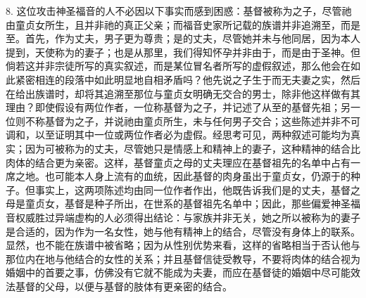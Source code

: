 8. 这位攻击神圣福音的人不必因以下事实而感到困惑：基督被称为之子，尽管祂由童贞女所生，且并非祂的真正父亲；而福音史家所记载的族谱并非追溯至，而是至。首先，作为丈夫，男子更为尊贵；是的丈夫，尽管她并未与他同居，因为本人提到，天使称为的妻子；也是从那里，我们得知怀孕并非由于，而是由于圣神。但倘若这并非宗徒所写的真实叙述，而是某位冒名者所写的虚假叙述，那么他会在如此紧密相连的段落中如此明显地自相矛盾吗？他先说之子生于而无夫妻之实，然后在给出族谱时，却将其追溯至那位与童贞女明确无交合的男士，除非他这样做有其理由？即使假设有两位作者，一位称基督为之子，并记述了从至的基督先祖；另一位则不称基督为之子，并说祂由童贞所生，未与任何男子交合；这些陈述并非不可调和，以至证明其中一位或两位作者必为虚假。经思考可见，两种叙述可能均为真实；因为可被称为的丈夫，尽管她只是情感上和精神上的妻子，这种精神的结合比肉体的结合更为亲密。这样，基督童贞之母的丈夫理应在基督祖先的名单中占有一席之地。也可能本人身上流有的血统，因此基督的肉身虽出于童贞女，仍源于的种子。但事实上，这两项陈述均由同一位作者作出，他既告诉我们是的丈夫，基督之母是童贞女，基督是种子所出，在世系的基督祖先名单中；因此，那些偏爱神圣福音权威胜过异端虚构的人必须得出结论：与家族并非无关，她之所以被称为的妻子是合适的，因为作为一名女性，她与他有精神上的结合，尽管没有身体上的联系。显然，也不能在族谱中被省略；因为从性别优势来看，这样的省略相当于否认他与那位内在地与他结合的女性的关系；并且基督信徒受教导，不要将肉体的结合视为婚姻中的首要之事，仿佛没有它就不能成为夫妻，而应在基督徒的婚姻中尽可能效法基督的父母，以便与基督的肢体有更亲密的结合。\par

